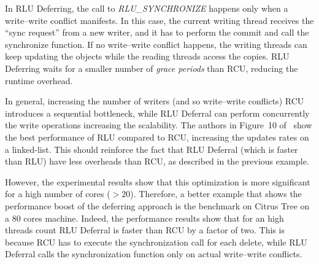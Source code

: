 \begin{refsection}
In RLU Deferring, the call to \emph{RLU\_SYNCHRONIZE} happens only when a
write--write conflict manifests.
%
In this case, the current writing thread receives the ``sync request'' from a
new writer, and it has to perform the commit and call the synchronize
function.
%
If no write--write conflict happens, the writing threads can keep updating the
objects while the reading threads access the copies.
%
RLU Deferring waits for a smaller number of \emph{grace periods} than RCU,
reducing the runtime overhead.

In general, increasing the number of writers (and so write--write conflicts)
RCU introduces a sequential bottleneck, while RLU Deferral can perform
concurrently the write operations increasing the scalability.
%
The authors in Figure~10 of~\cite{Matveev:2015:RLS:2815400.2815406} show the
best performance of RLU compared to RCU, increasing the updates rates on a
linked-list.
%
This should reinforce the fact that RLU Deferral (which is faster than RLU)
have less overheads than RCU, as described in the previous example.

However, the experimental results show that this optimization is more
significant for a high number of cores ($>20$).
%
Therefore, a better example that shows the performance boost of the deferring
approach is the benchmark on Citrus Tree on a 80 cores machine.
%
Indeed, the performance results show that for an high threads count RLU
Deferral is faster than RCU by a factor of two.
%
This is because RCU has to execute the synchronization call for each delete,
while RLU Deferral calls the synchronization function only on actual
write--write conflicts.


\end{refsection}
